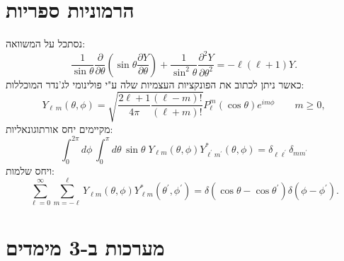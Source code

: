 \documentclass{tstextbook}
\begin{document}
\section{הרמוניות ספריות}

נסתכל על המשוואה:
$$\frac{1}{\sin\theta}\frac{\partial}{\partial\theta}\left(\sin\theta\frac{\partial Y}{\partial\theta}\right)+\frac{1}{\sin^{2}\theta}\frac{\partial^{2}Y}{\partial\theta^{2}}=-\ell(\ell+1)Y.$$
כאשר ניתן לכתוב את הפונקציות העצמיות שלה ע"י פולינומי לג'נדר המוכללות:
$$Y_{\ell\,m}(\theta,\phi)=\sqrt{\frac{2\ell+1}{4\pi}\frac{(\ell-m)!}{(\ell+m)!}}P_{\ell}^{m}(\cos\theta)e^{i m\phi}\qquad m\ge0,$$
מקיימים יחס אורתוגונאליות:
$$\int_{0}^{2\pi}d\phi\,\int_{0}^{\pi}d\theta\,\sin\theta\;Y_{\ell m}(\theta,\phi)Y_{\ell^{\prime}m^{\prime}}^{\ast}(\theta,\phi)=\delta_{\ell\ell^{\prime}}\delta_{m m^{\prime}}$$
ויחס שלמות:
$$\sum_{\ell=0}^{\infty}\sum_{m=-\ell}^{\ell}Y_{\ell m}(\theta,\phi)Y_{\ell m}^{*}(\theta^{\prime},\phi^{\prime})=\delta(\cos\theta-\cos\theta^{\prime})\delta(\phi-\phi^{\prime}).$$


\section{מערכות ב-3 מימדים}
\end{document}
